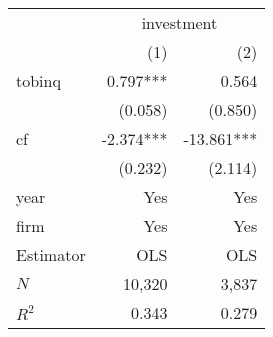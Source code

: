 \begin{tabular}{lrr}
\toprule
          & \multicolumn{2}{c}{investment} \\ 
\cmidrule(lr){2-3} 
          &       (1) &                (2) \\ 
\midrule
tobinq    &  0.797*** &              0.564 \\ 
          &   (0.058) &            (0.850) \\ 
cf        & -2.374*** &         -13.861*** \\ 
          &   (0.232) &            (2.114) \\ 
\midrule
year      &       Yes &                Yes \\ 
firm      &       Yes &                Yes \\ 
\midrule
Estimator &       OLS &                OLS \\ 
\midrule
$N$       &    10,320 &              3,837 \\ 
$R^2$     &     0.343 &              0.279 \\ 
\bottomrule
\end{tabular}
